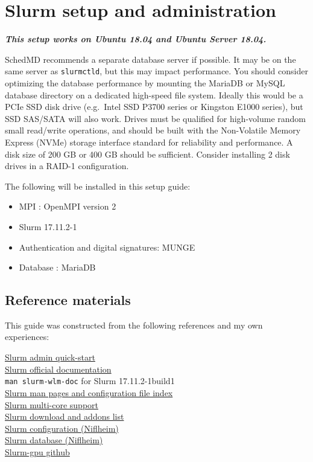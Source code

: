 \chapter{Slurm setup and administration} \label{ch:slurmsetup}

\textbf{\emph{This setup works on Ubuntu 18.04 and Ubuntu Server 18.04.}}

SchedMD recommends a separate database server if possible. It may be on the same server as \texttt{slurmctld}, but this may impact performance. You should consider optimizing the database performance by mounting the MariaDB or MySQL database directory on a dedicated high-speed file system. Ideally this would be a PCIe SSD disk drive (e.g.\ Intel SSD P3700 series or Kingston E1000 series), but SSD SAS/SATA will also work. Drives must be qualified for high-volume random small read/write operations, and should be built with the Non-Volatile Memory Express (NVMe) storage interface standard for reliability and performance. A disk size of 200 GB or 400 GB should be sufficient. Consider installing 2 disk drives in a RAID-1 configuration.

The following will be installed in this setup guide:

\begin{itemize}
\item MPI : OpenMPI version 2
\item Slurm 17.11.2-1
\item Authentication and digital signatures: MUNGE
\item Database : MariaDB
\end{itemize}

\section{Reference materials} \label{sec:slurmguides}

This guide was constructed from the following references and my own experiences:

\href{https://slurm.schedmd.com/quickstart_admin.html}{Slurm admin quick-start} \\
\indent \href{https://slurm.schedmd.com/documentation.html}{Slurm official documentation} \\
\indent \texttt{man slurm-wlm-doc} for Slurm 17.11.2-1build1 \\
\indent \href{https://slurm.schedmd.com/man_index.html}{Slurm man pages and configuration file index} \\
\indent \href{https://slurm.schedmd.com/mc_support.html}{Slurm multi-core support} \\
\indent \href{https://slurm.schedmd.com/download.html}{Slurm download and addons list} \\
\indent \href{https://wiki.fysik.dtu.dk/niflheim/Slurm_configuration}{Slurm configuration (Niflheim)} \\
\indent \href{https://wiki.fysik.dtu.dk/niflheim/Slurm_database}{Slurm database (Niflheim)} \\
\indent \href{https://github.com/dholt/slurm-gpu}{Slurm-gpu github}

